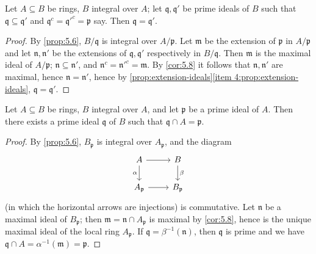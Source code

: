 \begin{corollary}\label{cor:5.9}
    Let $A \subseteq B$ be rings, $B$ integral over $A$; let $\mathfrak{q}, \mathfrak{q}'$ be prime ideals of $B$ such that $\mathfrak{q} \subseteq \mathfrak{q}'$ and $\mathfrak{q}^c = \mathfrak{q}'^c = \mathfrak{p}$ say. Then $\mathfrak{q} = \mathfrak{q}'$.
\end{corollary}

\begin{proof}
    By \eqref{prop:5.6}, $B/\mathfrak{q}$ is integral over $A/\mathfrak{p}$. Let $\mathfrak{m}$ be the extension of $\mathfrak{p}$ in $A/\mathfrak{p}$ and let $\mathfrak{n}, \mathfrak{n}'$ be the extensions of $\mathfrak{q}, \mathfrak{q}'$ respectively in $B/\mathfrak{q}$. Then $\mathfrak{m}$ is the maximal ideal of $A/\mathfrak{p}$; $\mathfrak{n} \subseteq \mathfrak{n}'$, and $\mathfrak{n}^c = \mathfrak{n}'^c = \mathfrak{m}$. By \eqref{cor:5.8} it follows that $\mathfrak{n}, \mathfrak{n}'$ are maximal, hence $\mathfrak{n} = \mathfrak{n}'$, hence by \eqref{prop:extension-ideals}\eqref{item 4:prop:extension-ideals}, $\mathfrak{q} = \mathfrak{q}'$.
\end{proof}

\begin{theorem}\label{thm:5.10}
    Let $A \subseteq B$ be rings, $B$ integral over $A$, and let $\mathfrak{p}$ be a prime ideal of $A$. Then there exists a prime ideal $\mathfrak{q}$ of $B$ such that $\mathfrak{q} \cap A = \mathfrak{p}$.
\end{theorem}
\begin{proof}
    By \eqref{prop:5.6}, $B_{\mathfrak{p}}$ is integral over $A_{\mathfrak{p}}$, and the diagram
    \[\begin{tikzcd}
        A & B \\
        {A_{\mathfrak{p}}} & {B_{\mathfrak{p}}}
        \arrow[from=1-1, to=1-2]
        \arrow["\alpha"', from=1-1, to=2-1]
        \arrow["\beta", from=1-2, to=2-2]
        \arrow[from=2-1, to=2-2]
    \end{tikzcd}\]
    (in which the horizontal arrows are injections) is commutative. Let $\mathfrak{n}$ be a maximal ideal of $B_{\mathfrak{p}}$; then $\mathfrak{m} = \mathfrak{n} \cap A_{\mathfrak{p}}$ is maximal by \eqref{cor:5.8}, hence is the unique maximal ideal of the local ring $A_{\mathfrak{p}}$. If $\mathfrak{q} = \beta^{-1}(\mathfrak{n})$, then $\mathfrak{q}$ is prime and we have $\mathfrak{q} \cap A = \alpha^{-1}(\mathfrak{m}) = \mathfrak{p}$.
\end{proof}

